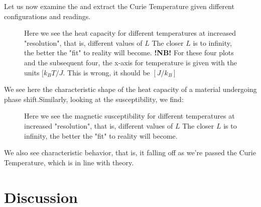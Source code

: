 \documentclass{article}
\begin{document}
\newline
Let us now examine the and extract the Curie Temperature given different configurations and readings.
\begin{figure}[ht!]
\centering
{}
\newline
{}
\caption{Here we see the heat capacity for different temperatures at increased "resolution", that is, different values of $L$ \newline
The closer $L$ is to infinity, the better the "fit" to reality will become.\newline
\textbf{!NB!} For these four plots and the subsequent four, the x-axis for temperature is given with the units $[k_B T/J$. This is wrong, it should be $[J/k_B]$}
\end{figure} \newline
We see here the characteristic shape of the heat capacity of a material undergoing phase shift.\newpage Similarly, looking at the susceptibility, we find:
\begin{figure}[ht!]
\centering
{}
\newline
{}
\caption{Here we see the magnetic susceptibility for different temperatures at increased "resolution", that is, different values of $L$ \newline
The closer $L$ is to infinity, the better the "fit" to reality will become.}
\end{figure}\newline
We also see characteristic behavior, that is, it falling off as we're passed the Curie Temperature, which is in line with theory. \newpage
\section{Discussion}
\end{document}
